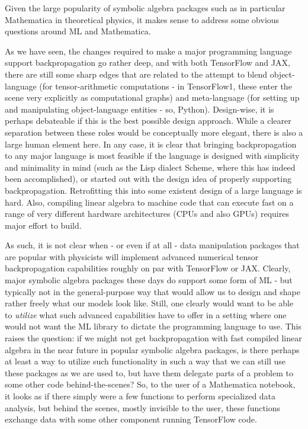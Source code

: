\documentclass[11pt]{article}
\begin{document}
Given the large popularity of symbolic algebra packages such as in
particular Mathematica in theoretical physics, it makes sense to address
some obvious questions around ML and Mathematica.

As we have seen, the changes required to make a major programming
language support backpropagation go rather deep, and with both
TensorFlow and JAX, there are still some sharp edges that are related to
the attempt to blend object-language (for tensor-arithmetic computations
- in TensorFlow1, these enter the scene very explicitly as computational
graphs) and meta-language (for setting up and manipulating
object-language entities - so, Python). Design-wise, it is perhaps
debateable if this is the best possible design approach. While a clearer
separation between these roles would be conceptually more elegant, there
is also a large human element here. In any case, it is clear that
bringing backpropagation to any major language is most feasible if the
language is designed with simplicity and minimality in mind (such as the
Lisp dialect Scheme, where this has indeed been accomplished), or
started out with the design idea of properly supporting backpropagation.
Retrofitting this into some existent design of a large language is hard.
Also, compiling linear algebra to machine code that can execute fast on
a range of very different hardware architectures (CPUs and also GPUs)
requires major effort to build.

As such, it is not clear when - or even if at all - data manipulation
packages that are popular with physicists will implement advanced
numerical tensor backpropagation capabilities roughly on par with
TensorFlow or JAX. Clearly, major symbolic algebra packages these days
do support some form of ML - but typically not in the general-purpose
way that would allow us to design and shape rather freely what our
models look like. Still, one clearly would want to be able to
\emph{utilize} what such advanced capabilities have to offer in a
setting where one would not want the ML library to dictate the
programming language to use. This raises the question: if we might not
get backpropagation with fast compiled linear algebra in the near future
in popular symbolic algebra packages, is there perhaps at least a way to
utilize such functionality in such a way that we can still use these
packages as we are used to, but have them delegate parts of a problem to
some other code behind-the-scenes? So, to the user of a Mathematica
notebook, it looks as if there simply were a few functions to perform
specialized data analysis, but behind the scenes, mostly invisible to
the user, these functions exchange data with some other component
running TensorFlow code.
\end{document}
